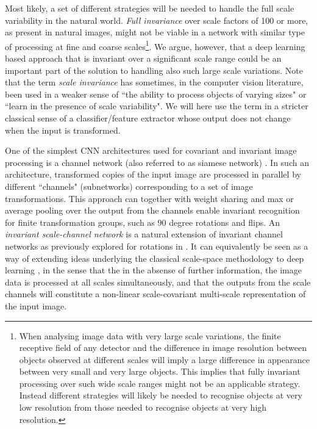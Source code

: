 \documentclass[twocolumn,runningheads]{svjour3}
\begin{document}
Most likely, a set of different strategies will be needed to handle
the full scale variability in the natural world. {\em Full
  invariance\/} over scale factors of 100 or more, as present in natural
images, might not be viable in a network with similar type of
processing at fine and coarse 
scales\footnote{When analysing image data with very large scale
  variations, the finite receptive field of any detector and the
  difference in image resolution between objects observed at different
  scales will imply a large difference in appearance between very
  small and very large objects. This implies that  fully invariant
  processing over such wide scale ranges might not be an applicable
  strategy. Instead different strategies will likely be needed to
  recognise objects at very low resolution from those needed to
  recognise objects at very high resolution.}. 
We argue, however, that a deep learning based approach that is
invariant over a significant scale range could be an important part 
of the solution to handling also such large scale variations. 
Note that the term {\em scale invariance\/} has sometimes, in the
computer vision literature, been used in a weaker sense of ``the
ability to process objects of varying sizes" or ``learn in the presence
of scale variability". We will here use the term in a stricter classical
sense of a classifier/feature extractor whose output does not change 
when the input is transformed.

One of the simplest CNN architectures used for covariant and invariant
image processing is a channel network (also referred to as siamese
network)
\cite{CirMeiSch12-CVPR,LapSavBuhPol16-CVPR,DieWilDam15-RoyAstro}. 
In such an architecture, transformed copies of the input image are
processed in parallel by different ``channels" (subnetworks)
corresponding to a set of image transformations. This approach can
together with weight sharing and max or average pooling over the
output from the channels enable invariant recognition for finite
transformation groups, such as  90 degree rotations and flips. An
{\em invariant scale-channel network\/} is a natural extension of
invariant channel networks as previously explored for rotations in
\cite{LapSavBuhPol16-CVPR}.  It can equivalently be seen as a way of
extending ideas underlying the classical scale-space methodology to
deep learning
\cite{Iij62,Wit83,Koe84,KoeDoo92-PAMI,Lin93-Dis,Lin94-SI,Flo97-book,WeiIshImi99-JMIV,Haa04-book,DuiFloGraRom04-JMIV,Lin10-JMIV},
in the sense that the in the absense of further information, the image
data is processed at all scales simultaneously, and that the outputs from the scale channels will constitute
a non-linear scale-covariant multi-scale representation of the input
image.
\end{document}
